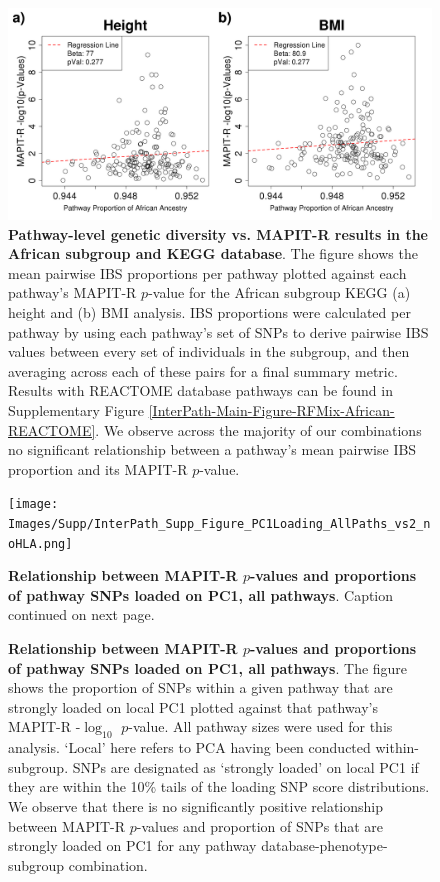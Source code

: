 \begin{figure}[htbp]
\centering
\includegraphics[scale=.35]{Images/Supp/InterPath_Supp_Figure_RFMix_vs2_African_KEGG_noHLA.png}
\caption[TBD]{\textbf{Pathway-level genetic diversity vs. MAPIT-R results in the African subgroup and KEGG database}. The figure shows the mean pairwise IBS proportions per pathway plotted against each pathway's MAPIT-R $p$-value for the African subgroup KEGG (a) height and (b) BMI analysis. IBS proportions were calculated per pathway by using each pathway's set of SNPs to derive pairwise IBS values between every set of individuals in the subgroup, and then averaging across each of these pairs for a final summary metric. Results with REACTOME database pathways can be found in Supplementary Figure \ref{InterPath-Main-Figure-RFMix-African-REACTOME}. We observe across the majority of our combinations no significant relationship between a pathway's mean pairwise IBS proportion and its MAPIT-R $p$-value.}
\label{InterPath-Supp-Figure-RFMix-African-KEGG}
\end{figure}
\clearpage

\setlength{\footskip}{3cm}
\begin{figure}[htbp]
\centering
\vspace*{-2cm}
\texttt{[image: Images/Supp/InterPath\_Supp\_Figure\_PC1Loading\_AllPaths\_vs2\_noHLA.png]}
\caption[TBD]{\textbf{Relationship between MAPIT-R $p$-values and proportions of pathway SNPs loaded on PC1, all pathways}. Caption continued on next page.}
\label{InterPath-Supp-Figure-PC1Loading-AllPaths}
\end{figure}
\clearpage
\setlength{\footskip}{1cm}

\addtocounter{figure}{-1}
\begin{figure} [t!]
  \caption{\textbf{Relationship between MAPIT-R $p$-values and proportions of pathway SNPs loaded on PC1, all pathways}. The figure shows the proportion of SNPs within a given pathway that are strongly loaded on local PC1 plotted against that pathway's MAPIT-R -$\log_{10}$ $p$-value. All pathway sizes were used for this analysis. `Local' here refers to PCA having been conducted within-subgroup. SNPs are designated as `strongly loaded' on local PC1 if they are within the 10\% tails of the loading SNP score distributions. We observe that there is no significantly positive relationship between MAPIT-R $p$-values and proportion of SNPs that are strongly loaded on PC1 for any pathway database-phenotype-subgroup combination.}
\label{InterPath-Supp-Figure-PC1Loading-AllPaths-Caption}
\end{figure}
\clearpage

